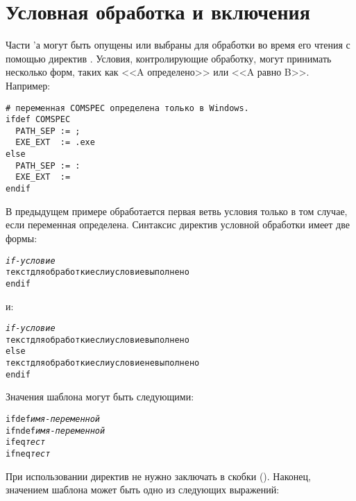 \section{Условная обработка и включения}
\label{sec:cond_inc_processing}
Части \Makefile{}'а могут быть опущены или выбраны для обработки во
время его чтения с помощью директив .
Условия, контролирующие обработку, могут принимать несколько форм,
таких как <<A определено>> или <<A равно B>>. Например:

{\footnotesize
\begin{verbatim}
# переменная COMSPEC определена только в Windows.
ifdef COMSPEC
  PATH_SEP := ;
  EXE_EXT  := .exe
else
  PATH_SEP := :
  EXE_EXT  :=
endif
\end{verbatim}
}

В предыдущем примере обработается первая ветвь условия только в том
случае, если переменная  определена. Синтаксис
директив условной обработки имеет две формы:

{\footnotesize
\begin{alltt}
\emph{if-условие}
  текст для обработки если условие выполнено
endif
\end{alltt}
}

{\flushleft и:}

{\footnotesize
\begin{alltt}
\emph{if-условие}
  текст для обработки если условие выполнено
else
  текст для обработки если условие не выполнено
endif
\end{alltt}
}

Значения шаблона  могут быть следующими:

{\footnotesize
\begin{alltt}
ifdef  \emph{имя-переменной}
ifndef \emph{имя-переменной}
ifeq  \emph{тест}
ifneq \emph{тест}
\end{alltt}
}

При использовании директив 
 не нужно заключать в скобки
(\command{\$( )}). Наконец, значением шаблона 
может быть одно из следующих выражений:

